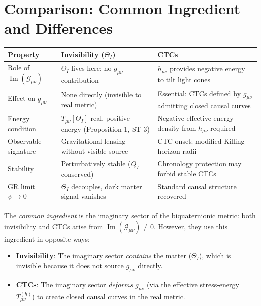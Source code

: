 \documentclass[12pt]{article}
\begin{document}
\section{Comparison: Common Ingredient and Differences}

\begin{center}
\renewcommand{\arraystretch}{1.5}
\begin{tabular}{|p{4cm}|p{4.5cm}|p{4.5cm}|}
\hline
\textbf{Property} & \textbf{Invisibility ($\Theta_I$)} & \textbf{CTCs}\\
\hline
Role of $\operatorname{Im}(\mathcal{G}_{\mu\nu})$ &
  $\Theta_I$ lives here; no $g_{\mu\nu}$ contribution &
  $h_{\mu\nu}$ provides negative energy to tilt light cones\\
\hline
Effect on $g_{\mu\nu}$ &
  None directly (invisible to real metric) &
  Essential: CTCs defined by $g_{\mu\nu}$ admitting closed causal curves\\
\hline
Energy condition &
  $T_{\mu\nu}[\Theta_I]$ real, positive energy (Proposition 1, ST-3) &
  Negative effective energy density from $h_{\mu\nu}$ required\\
\hline
Observable signature &
  Gravitational lensing without visible source &
  CTC onset: modified Killing horizon radii\\
\hline
Stability &
  Perturbatively stable ($Q_I$ conserved) &
  Chronology protection may forbid stable CTCs\\
\hline
GR limit $\psi\to 0$ &
  $\Theta_I$ decouples, dark matter signal vanishes &
  Standard causal structure recovered\\
\hline
\end{tabular}
\end{center}

The \emph{common ingredient} is the imaginary sector of the biquaternionic
metric: both invisibility and CTCs arise from $\operatorname{Im}(\mathcal{G}_{\mu\nu})
\neq 0$.  However, they use this ingredient in opposite ways:
\begin{itemize}
  \item \textbf{Invisibility}: The imaginary sector \emph{contains}
    the matter ($\Theta_I$), which is invisible because it does not
    source $g_{\mu\nu}$ directly.
  \item \textbf{CTCs}: The imaginary sector \emph{deforms}
    $g_{\mu\nu}$ (via the effective stress-energy $T_{\mu\nu}^{(h)}$)
    to create closed causal curves in the real metric.
\end{itemize}
\end{document}
